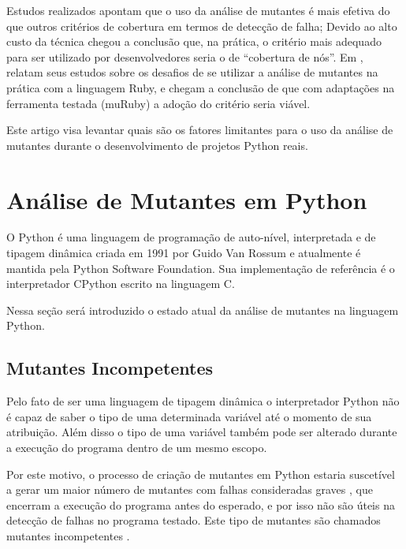 \documentclass[12pt]{article}
\begin{document}
Estudos realizados \cite{Frankl:1993, Li:2009, Andrews:2005} apontam que
o uso da análise de mutantes é mais efetiva do que outros critérios de 
cobertura em termos de detecção de falha; Devido ao alto custo da técnica
\cite{Gopinath:2014} chegou a conclusão que, na prática, o critério 
mais adequado para ser utilizado por desenvolvedores seria o de ``cobertura
de nós''. Em \cite{Li:2015}, relatam seus estudos sobre os desafios de se 
utilizar a análise de mutantes na prática com a linguagem Ruby, e chegam
a conclusão de que com adaptações na ferramenta testada (muRuby) a adoção
do critério seria viável.

Este artigo visa levantar quais são os fatores limitantes para o uso da análise
de mutantes durante o desenvolvimento de projetos Python reais.


\section{Análise de Mutantes em Python}

O Python é uma linguagem de programação de auto-nível, interpretada e de tipagem
dinâmica criada em 1991 por Guido Van Rossum e atualmente é mantida pela 
Python Software Foundation\footnotemark. Sua implementação de referência é o 
interpretador CPython escrito na linguagem C.


Nessa seção será introduzido o estado atual da análise de mutantes na
linguagem Python.

\subsection{Mutantes Incompetentes}

Pelo fato de ser uma linguagem de tipagem dinâmica o interpretador Python não
é capaz de saber o tipo de uma determinada variável até o momento de sua
atribuição. Além disso o tipo de uma variável também pode ser alterado durante a 
execução do programa dentro de um mesmo escopo.

Por este motivo, o processo de criação de mutantes em Python estaria 
suscetível a gerar um maior número de mutantes com falhas consideradas
graves \cite{Bessam:2014}, que encerram a execução do programa antes do 
esperado, e por isso não são úteis na detecção de falhas no programa testado.
Este tipo de mutantes são chamados mutantes incompetentes \cite{Bottaci:2010}.
\end{document}
